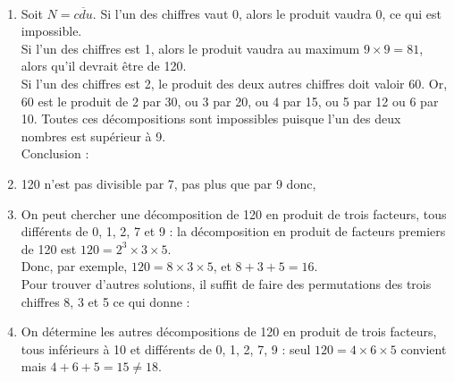 \ \\ [-5mm]
\begin{enumerate}
      \item Soit $N=\overline{cdu}$. Si l'un des chiffres vaut 0, alors le produit vaudra 0, ce qui est  impossible. \\
      Si l'un des chiffres est 1, alors le produit vaudra au maximum $9\times9 =81$, alors qu'il devrait être de 120. \\
      Si l'un des chiffres est 2, le produit des deux autres chiffres doit valoir $60$. Or, 60 est le produit de 2 par 30, ou 3 par 20, ou 4 par 15, ou 5 par 12 ou 6 par 10. Toutes ces décompositions sont impossibles puisque l'un des deux nombres est supérieur à 9. \\
      Conclusion : 
      \item 120 n'est pas divisible par 7, pas plus que par 9 donc, 
      \item On peut  chercher une décomposition de 120 en produit de trois facteurs, tous différents de 0, 1, 2, 7 et 9 : la décomposition en produit de facteurs premiers de 120 est $120 =2^3\times3\times5$. \\
      Donc, par exemple, $120 =8\times3\times5$, et $8+3+5 =16$.  \\
      Pour trouver d'autres solutions, il suffit de faire des permutations des trois chiffres 8, 3 et 5 ce qui donne : \\
      \item On détermine les autres décompositions de 120 en produit de trois facteurs, tous inférieurs à 10 et différents de 0, 1, 2, 7, 9 : seul $120 =4\times6\times5$ convient mais $4+6+5 =15 \neq 18$. \\
   \end{enumerate}
